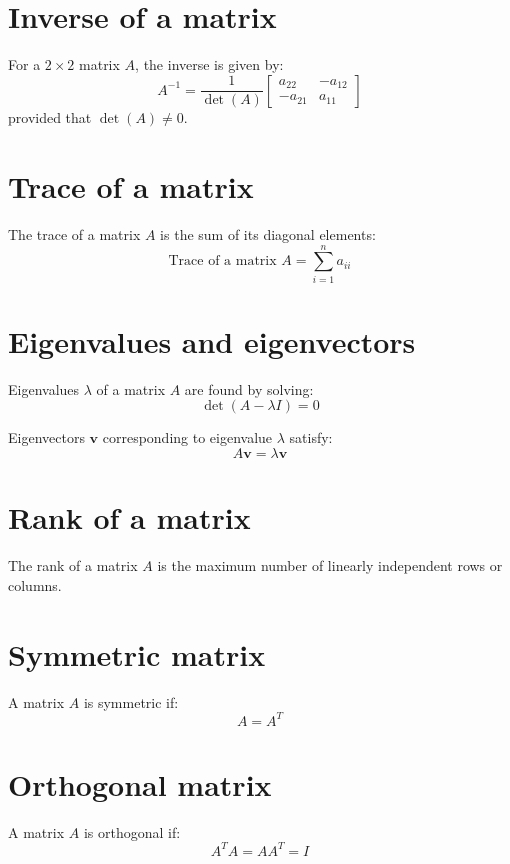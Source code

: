 \documentclass{article}
\begin{document}
\section{Inverse of a matrix}
For a $2 \times 2$ matrix $A$, the inverse is given by:
\[
A^{-1} = \frac{1}{\det(A)} \begin{bmatrix}
a_{22} & -a_{12} \\
-a_{21} & a_{11}
\end{bmatrix}
\]
provided that $\det(A) \neq 0$.

\section{Trace of a matrix}
The trace of a matrix $A$ is the sum of its diagonal elements:
\[ 
\text{Trace of a matrix } A = \sum_{i=1}^{n} a_{ii} 
\]

\section{Eigenvalues and eigenvectors}
Eigenvalues $\lambda$ of a matrix $A$ are found by solving:
\[ 
\det(A - \lambda I) = 0 
\]

Eigenvectors $\mathbf{v}$ corresponding to eigenvalue $\lambda$ satisfy:
\[ 
A\mathbf{v} = \lambda \mathbf{v} 
\]

\section{Rank of a matrix}
The rank of a matrix $A$ is the maximum number of linearly independent rows or columns.

\section{Symmetric matrix}
A matrix $A$ is symmetric if:
\[ 
A = A^T 
\]

\section{Orthogonal matrix}
A matrix $A$ is orthogonal if:
\[ 
A^T A = AA^T = I 
\]
\end{document}
